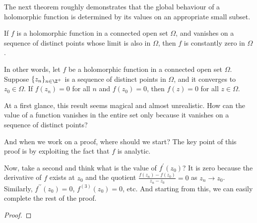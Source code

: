 \documentclass[thmcnt=section, color=cyan, 12pt]{my-elegantbook}
\begin{document}
The next theorem roughly demonstrates that the global behaviour of a holomorphic function is determined by its values on an appropriate small subset.

\begin{theorem}
    If $f$ is a holomorphic function in a connected open set $\Omega$, and vanishes on a sequence of distinct points whose limit is also in $\Omega$, then $f$ is constantly zero in $\Omega$.

    In other words, let $f$ be a holomorphic function in a connected open set $\Omega$.
    Suppose $\{z_n\}_{n \in \Z^+}$ is a sequence of distinct points in $\Omega$, and it converges to $z_0 \in \Omega$. If $f(z_n) = 0$ for all $n$ and $f(z_0) = 0$, then $f(z) = 0$ for all $z \in \Omega$.
\end{theorem}

At a first glance, this result seems magical and almost unrealistic.
How can the value of a function vanishes in the entire set only because it vanishes on a sequence of distinct points?

And when we work on a proof, where should we start?
The key point of this proof is by exploiting the fact that $f$ is analytic.

Now, take a second and think what is the value of $f^\prime(z_0)$?
It is zero because the derivative of $f$ exists at $z_0$ and the quotient $\frac{f(z_n) - f(z_0)}{z_n - z_0} = 0$ as $z_n \to z_0$.
Similarly, $f^{\prime\prime}(z_0) = 0$, $f^{(3)}(z_0) = 0$, etc.
And starting from this, we can easily complete the rest of the proof.

\begin{proof}

\end{proof}



\printbibliography[heading=bibintoc, title=References]


\printindex
\end{document}
